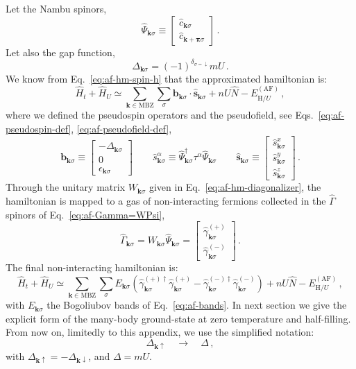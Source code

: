 Let the Nambu spinors,
\[
	\hat \Psi_{\mathbf{k}\sigma} \equiv \begin{bmatrix}
		\hat c_{\mathbf{k}\sigma} \\
		\hat c_{\mathbf{k}+\bm{\pi}\sigma} 
	\end{bmatrix} \, .
\]
Let also the gap function,
\[
	\Delta_{\mathbf{k}\sigma} = (-1)^{\delta_{\sigma=\downarrow}} mU \, .
\]
We know from Eq.~\eqref{eq:af-hm-spin-h} that the approximated hamiltonian is:
\[
	\hat H_t + \hat H_U \simeq \sum_{\mathbf{k} \in \mathrm{MBZ}} \sum_\sigma \mathbf{b}_{\mathbf{k}\sigma} \cdot \hat{\mathbf{s}}_{\mathbf{k}\sigma} + nU \hat N - E_{\mathrm{H}/U}^{(\mathrm{AF})} \, ,
\]
where we defined the pseudospin operators and the pseudofield, see Eqs.~\eqref{eq:af-pseudospin-def}, \eqref{eq:af-pseudofield-def},
\[
	\mathbf{b}_{\mathbf{k}\sigma} \equiv \begin{bmatrix}
		-\Delta_{\mathbf{k}\sigma} \\ 0 \\ \epsilon_{\mathbf{k}\sigma} 
	\end{bmatrix} 
	\qquad
	\hat s_{\mathbf{k}\sigma}^\alpha \equiv \hat \Psi_{\mathbf{k}\sigma}^\dagger \tau^\alpha \hat \Psi_{\mathbf{k}\sigma}
	\qquad
	\hat{\mathbf{s}}_{\mathbf{k}\sigma} \equiv \begin{bmatrix}
		\hat s_{\mathbf{k}\sigma}^x \\
		\hat s_{\mathbf{k}\sigma}^y \\
		\hat s_{\mathbf{k}\sigma}^z
	\end{bmatrix} \, .
\]
Through the unitary matrix $W_{\mathbf{k}\sigma}$ given in Eq.~\eqref{eq:af-hm-diagonalizer}, the hamiltonian is mapped to a gas of non-interacting fermions collected in the $\hat \Gamma$ spinors of Eq.~\eqref{eq:af-Gamma=WPsi},
\[
	\hat\Gamma_{\mathbf{k}\sigma} = W_{\mathbf{k}\sigma} \hat \Psi_{\mathbf{k}\sigma} = \begin{bmatrix}
		\hat \gamma_{\mathbf{k}\sigma}^{(+)} \\ \hat \gamma_{\mathbf{k}\sigma}^{(-)}
	\end{bmatrix} \, .
\]
The final non-interacting hamiltonian is:
\[
	\hat H_t + \hat H_U \simeq \sum_{\mathbf{k} \in \mathrm{MBZ}} \sum_\sigma E_{\mathbf{k}\sigma} \left(
		\hat \gamma_{\mathbf{k}\sigma}^{(+)\dagger} \hat \gamma_{\mathbf{k}\sigma}^{(+)} - \hat \gamma_{\mathbf{k}\sigma}^{(-)\dagger} \hat \gamma_{\mathbf{k}\sigma}^{(-)}
	\right) + nU \hat N -  E_{\mathrm{H}/U}^{(\mathrm{AF})} \, ,
\]
with $E_{\mathbf{k}\sigma}$ the Bogoliubov bands of Eq.~\eqref{eq:af-bands}. In next section we give the explicit form of the many-body ground-state at zero temperature and half-filling. From now on, limitedly to this appendix, we use the simplified notation:
\[
	\Delta_{\mathbf{k}\uparrow} \quad\to\quad \Delta \, ,
\]
with $\Delta_{\mathbf{k}\uparrow} = -\Delta_{\mathbf{k}\downarrow}$, and $\Delta=mU$.

